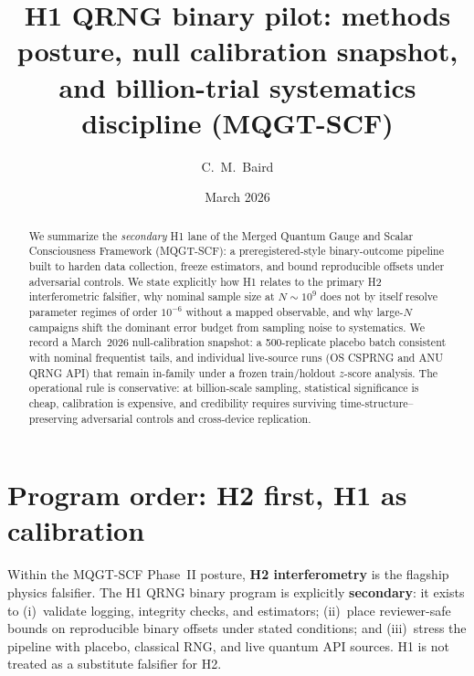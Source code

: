 \documentclass[reprint,amsmath,amssymb,aps,showkeys]{revtex4-2}
\begin{document}
\title{H1 QRNG binary pilot: methods posture, null calibration snapshot,\\and billion-trial systematics discipline (MQGT-SCF)}

\author{C.~M.~Baird}

\date{March 2026}

\begin{abstract}
We summarize the \emph{secondary} H1 lane of the Merged Quantum Gauge and Scalar Consciousness Framework (MQGT-SCF): a preregistered-style binary-outcome pipeline built to harden data collection, freeze estimators, and bound reproducible offsets under adversarial controls. We state explicitly how H1 relates to the primary H2 interferometric falsifier, why nominal sample size at $N\sim 10^9$ does not by itself resolve parameter regimes of order $10^{-6}$ without a mapped observable, and why large-$N$ campaigns shift the dominant error budget from sampling noise to systematics. We record a March~2026 null-calibration snapshot: a 500-replicate placebo batch consistent with nominal frequentist tails, and individual live-source runs (OS CSPRNG and ANU QRNG API) that remain in-family under a frozen train/holdout $z$-score analysis. The operational rule is conservative: at billion-scale sampling, statistical significance is cheap, calibration is expensive, and credibility requires surviving time-structure--preserving adversarial controls and cross-device replication.
\end{abstract}

\maketitle

\section{Program order: H2 first, H1 as calibration}
Within the MQGT-SCF Phase~II posture, \textbf{H2 interferometry} is the flagship physics falsifier. The H1 QRNG binary program is explicitly \textbf{secondary}: it exists to (i)~validate logging, integrity checks, and estimators; (ii)~place reviewer-safe bounds on reproducible binary offsets under stated conditions; and (iii)~stress the pipeline with placebo, classical RNG, and live quantum API sources. H1 is not treated as a substitute falsifier for H2.
\end{document}
